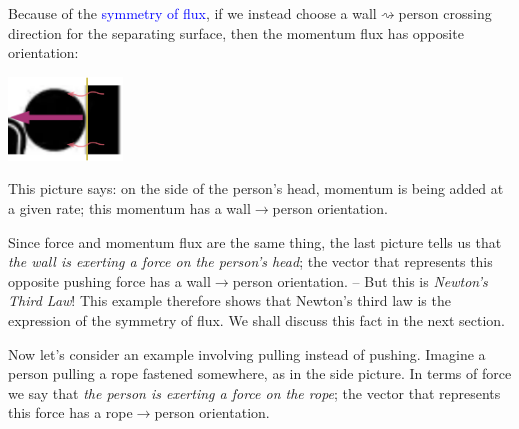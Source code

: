 \documentclass[a4paper,12pt,%
onecolumn,oneside,%
british%
]{memoir}
\renewcommand*{\|}[1][]{\nonscript\:#1\vert\nonscript\:\mathopen{}}
\newcommand*{\sect}{\S}%
\renewcommand*{\autoref}[2]{\sidepar{\vspace{-1ex}\footnotesize{\color{blue}\faIcon{%
angle-right%
}\enspace\sect~\ref{#1} page~\pageref{#1}}}\textcolor{blue}{#2}}
\begin{document}
Because of the \autoref{def:symmetryflux}{symmetry of flux}, if we instead choose a wall$\rightsquigarrow$person crossing direction for the separating surface, then the momentum flux has opposite orientation:\noprelistbreak
\begin{center}
  \includegraphics[height=6em]{images/person_push_flux_left.pdf}
\end{center}
This picture says: on the side of the person's head, momentum is being added at a given rate; this momentum has a wall$\rightarrow$person orientation.

Since force and momentum flux are the same thing, the last picture tells us that \emph{the wall is exerting a force on the person's head}; the vector that represents this opposite pushing force has a wall$\to$person orientation. -- But this is \emph{Newton's Third Law}! This example therefore shows that Newton's third law is the expression of the symmetry of flux. We shall discuss this fact in the next section.

\medskip

Now let's consider an example involving pulling instead of pushing. Imagine a person pulling a rope fastened somewhere, as in the side picture. In terms of force we say that \emph{the person is exerting a force on the rope}; the vector that represents this force has a rope$\rightarrow$person orientation.
%
%
\end{document}
